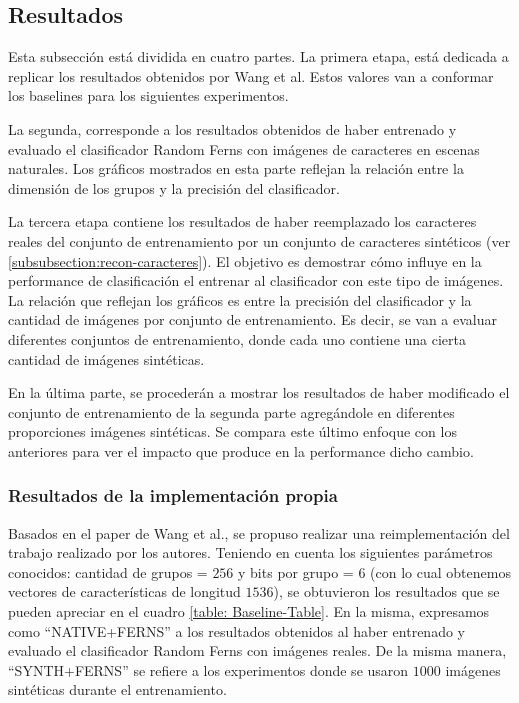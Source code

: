 \newpage
\subsection{Resultados}

\label{subsection:resultados}

	Esta subsección está dividida en cuatro partes. La primera etapa, está dedicada a replicar los resultados obtenidos por Wang et al. Estos valores van a conformar los baselines para los siguientes experimentos.

	La segunda, corresponde a los resultados obtenidos de haber entrenado y evaluado el clasificador Random Ferns con imágenes de caracteres en escenas naturales. Los gráficos mostrados en esta parte reflejan la relación entre la dimensión de los grupos y la precisión del clasificador.

	La tercera etapa contiene los resultados de haber reemplazado los caracteres reales del conjunto de entrenamiento por un conjunto de caracteres sintéticos (ver \ref{subsubsection:recon-caracteres}). El objetivo es demostrar cómo influye en la performance de clasificación el entrenar al clasificador con este tipo de imágenes. La relación que reflejan los gráficos es entre la precisión del clasificador y la cantidad de imágenes por conjunto de entrenamiento. Es decir, se van a evaluar diferentes conjuntos de entrenamiento, donde cada uno contiene una cierta cantidad de imágenes sintéticas.

	En la última parte, se procederán a mostrar los resultados de haber modificado el conjunto de entrenamiento de la segunda parte agregándole en diferentes proporciones imágenes sintéticas. Se compara este último enfoque con los anteriores para ver el impacto que produce en la performance dicho cambio.

	\subsubsection{Resultados de la implementación propia}
	\label{subsubsection: baseline-propio}

	Basados en el paper de Wang et al., se propuso realizar una reimplementación del trabajo realizado por los autores. Teniendo en cuenta los siguientes parámetros conocidos: cantidad de grupos = $256$ y bits por grupo = $6$ (con lo cual obtenemos vectores de características de longitud $1536$), se obtuvieron los resultados que se pueden apreciar en el cuadro \ref{table: Baseline-Table}. En la misma, expresamos como ``NATIVE+FERNS'' a los resultados obtenidos al haber entrenado y evaluado el clasificador Random Ferns con imágenes reales. De la misma manera, ``SYNTH+FERNS'' se  refiere a los experimentos donde se usaron $1000$ imágenes sintéticas durante el entrenamiento.

